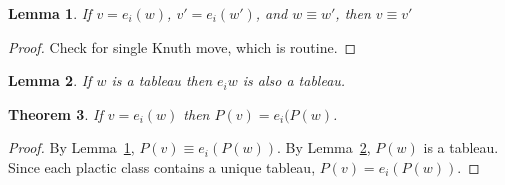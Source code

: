 \documentclass[12pt]{amsart}
\newtheorem{theorem}{Theorem}[subsection]
\newtheorem{lemma}[theorem]{Lemma}
\theoremstyle{definition}
\theoremstyle{example}
\begin{document}
\begin{lemma}
  \label{lemma:knuth-plactic}
  If $v=e_i(w)$, $v'=e_i(w')$, and $w\equiv w'$, then $v\equiv v'$
\end{lemma}
\begin{proof}
  Check for single Knuth move, which is routine.
\end{proof}
\begin{lemma}
  \label{lemma:tab2tab}
  If $w$ is a tableau then $e_iw$ is also a tableau.
\end{lemma}
\begin{theorem}
  If $v=e_i(w)$ then $P(v)=e_i(P(w)$.
\end{theorem}
\begin{proof}
  By Lemma~\ref{lemma:knuth-plactic}, $P(v)\equiv e_i(P(w))$.
  By Lemma~\ref{lemma:tab2tab}, $P(w)$ is a tableau.
  Since each plactic class contains a unique tableau, $P(v)=e_i(P(w))$.
\end{proof}
\end{document}
